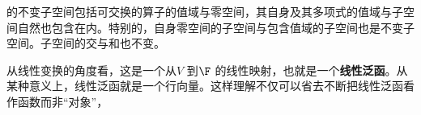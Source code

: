 的不变子空间包括可交换的算子的值域与零空间，其自身及其多项式的值域与子空间自然也包含在内。特别的，自身零空间的子空间与包含值域的子空间也是不变子空间。子空间的交与和也不变。

从线性变换的角度看，这是一个从\(V\) 到\(\F\) 的线性映射，也就是一个\textbf{线性泛函}。从某种意义上，线性泛函就是一个行向量。这样理解不仅可以省去不断把线性泛函看作函数而非``对象''，

